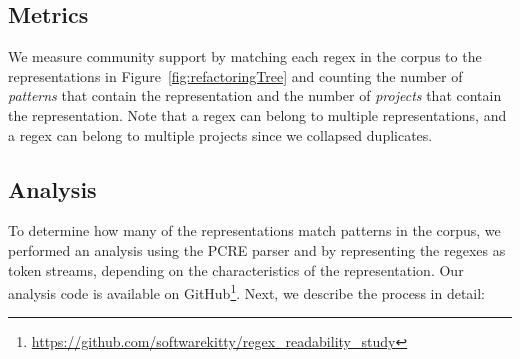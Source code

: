 \subsection{Metrics}
\label{sec:communitymetric}
We measure community support by matching each regex in the corpus to the representations in Figure~\ref{fig:refactoringTree} and counting the number of \emph{patterns} that contain the representation and the number of \emph{projects} that contain the representation.
Note that a regex can belong to multiple representations, and a regex can belong to multiple projects since we collapsed duplicates. %
%
%









\subsection{Analysis}
\label{communityanalysis}
To determine how many of the representations match patterns in the corpus, we performed an analysis using the PCRE parser and by representing the regexes as token streams, depending on the characteristics of the representation. Our analysis code is available on GitHub\footnote{\url{https://github.com/softwarekitty/regex_readability_study}}. Next, we describe the process in detail:

